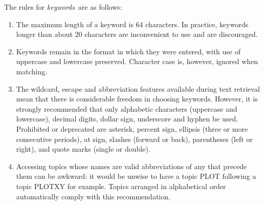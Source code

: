 The rules for {\it keywords}\, are as follows:
\begin{enumerate}
\item The maximum length of a keyword is 64 characters.  In practice,
keywords longer than about 20 characters are inconvenient to use
and are discouraged.
\item Keywords remain in the format in which they were entered, with
use of uppercase and lowercase preserved.  Character case is, however,
ignored when matching.
\item The wildcard, escape and abbreviation features available during
text retrieval mean that there is considerable freedom in choosing
keywords.  However, it is strongly recommended that only alphabetic
characters (uppercase and lowercase), decimal digits, dollar sign,
underscore and hyphen be used.  Prohibited or deprecated are
asterisk, percent sign, ellipsis (three or more consecutive periods), at
sign, slashes (forward or back), parentheses (left or right), and quote
marks (single or double).
\item Accessing topics whose names are valid abbreviations
of any that precede them can be awkward: it would be
unwise to have a topic PLOT following a topic PLOTXY for example.
Topics arranged in alphabetical order automatically comply with
this recommendation.
\end{enumerate}

